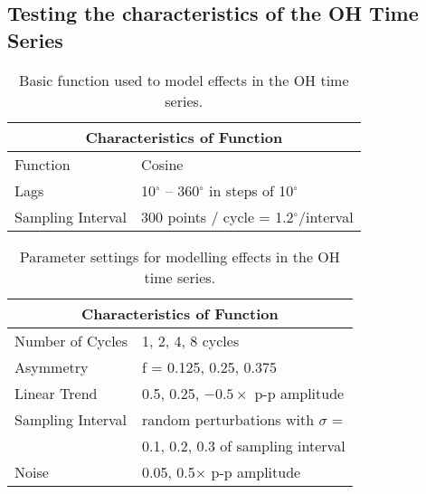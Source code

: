 \documentclass[usenatbib,usegraphicx]{mn2e}
\begin{document}
\subsection{Testing the characteristics of the OH Time Series}


\begin{table}

\caption{Basic function used to model effects in the OH time
series.} 
\label{tbl:tsttschar}

\begin{tabular}{|l|l|}

\hline
\multicolumn{2}{c}{Characteristics of Function} \\

\hline

Function & Cosine \\
Lags & 10$^\circ$ -- 360$^\circ$ in steps of 10$^\circ$ \\
Sampling Interval & 300 points / cycle = 1.2$^\circ$/interval \\

\hline

\end{tabular}
\end{table}



\begin{table}

\caption{Parameter settings for modelling effects in the OH
time series.}
\label{tbl:parmvartschar}

\begin{tabular}{|l|l|}

\hline
\multicolumn{2}{c}{Characteristics of Function} \\

\hline

Number of Cycles & 1, 2, 4, 8 cycles \\
Asymmetry & f = 0.125, 0.25, 0.375 \\
Linear Trend & 0.5, 0.25, $-0.5\times$ p-p amplitude \\
Sampling Interval & random perturbations with $\sigma$ = \\
 & 0.1, 0.2, 0.3 of sampling interval \\
Noise & 0.05, 0.5$\times$ p-p amplitude \\

\hline

\end{tabular}
\end{table}
\end{document}
